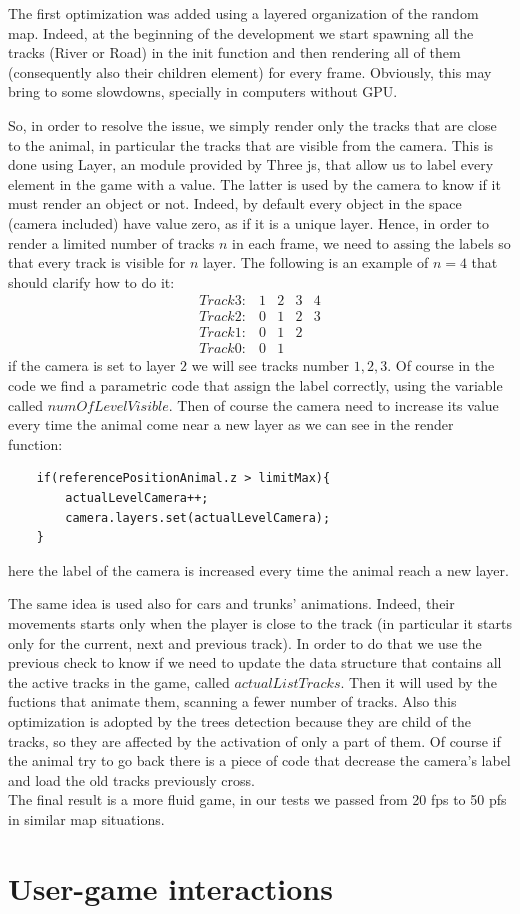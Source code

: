 \documentclass[a4paper, 11pt]{article}
\begin{document}
The first optimization was added using a layered organization of the random map. Indeed, at the beginning of the development we start spawning all the tracks (River or Road) in the init function and then rendering all of them (consequently also their children element) for every frame. Obviously, this may bring to some slowdowns, specially in computers without GPU. 

So, in order to resolve the issue, we simply render only the tracks that are close to the animal, in particular the tracks that are visible from the camera. 
This is done using Layer, an module provided by Three js, that allow us to label every element in the game with a value. The latter is used by the camera to know if it must render an object or not. Indeed, by default every object in the space (camera included) have value zero, as if it is a unique layer. 
Hence, in order to render a limited number of tracks $n$ in each frame, we need to assing the labels so that every track is visible for $n$ layer. The following is an example of $n=4$ that should clarify how to do it:
\begin{equation}
    \begin{array}{lllll}
	Track3: & 1 & 2 & 3 & 4\\
	Track2: & 0 & 1 & 2 & 3\\
	Track1: & 0 & 1 & 2\\
	Track0: & 0 & 1
    \end{array}
\end{equation}
if the camera is set to layer $2$ we will see tracks number $1,2,3$.
Of course in the code we find a parametric code that assign the label correctly, using the variable called $numOfLevelVisible$.
Then of course the camera need to increase its value every time the animal come near a new layer as we can see in the render function:
\begin{lstlisting}
	if(referencePositionAnimal.z > limitMax){
		actualLevelCamera++;
      	camera.layers.set(actualLevelCamera);
	}
\end{lstlisting}
here the label of the camera is increased every time the animal reach a new layer. 

The same idea is used also for cars and trunks' animations. Indeed, their movements starts only when the player is close to the track (in particular it starts only for the current, next and previous track). In order to do that we use the previous check to know if we need to update the data structure that contains all the active tracks in the game, called $actualListTracks$. Then it will used by the fuctions that animate them, scanning a fewer number of tracks. Also this optimization is adopted by the trees detection because they are child of the tracks, so they are affected by the activation of only a part of them. 
Of course if the animal try to go back there is a piece of code that decrease the camera's label and load the old tracks previously cross. \\

The final result is a more fluid game, in our tests we passed from 20 fps to 50 pfs in similar map situations. 


\section{User-game interactions}
\end{document}
